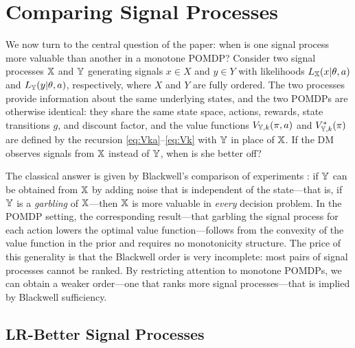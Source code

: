 \section{Comparing Signal Processes}\label{sec:comparison}

We now turn to the central question of the paper: when is one signal
process more valuable than another in a monotone POMDP? Consider two
signal processes ${\mathbb{X}}$ and ${\mathbb{Y}}$ generating signals $x \in X$ and
$y \in Y$ with likelihoods $L_{\mathbb{X}}(x|\theta,a)$ and $L_{\mathbb{Y}}(y|\theta,a)$,
respectively, where $X$ and $Y$ are fully ordered. The two processes
provide information about the same underlying states, and the two
POMDPs are otherwise identical: they share the same state space,
actions, rewards, state transitions $g$, and discount factor, and the
value functions $V_{{\mathbb{Y}},k}(\pi,a)$ and $V_{{\mathbb{Y}},k}^*(\pi)$ are defined
by the recursion \eqref{eq:Vka}--\eqref{eq:Vk} with ${\mathbb{Y}}$ in place of
${\mathbb{X}}$. If the DM observes signals from ${\mathbb{X}}$ instead of ${\mathbb{Y}}$, when is
she better off?

The classical answer is given by Blackwell's comparison of experiments
\citep{blackwell1951comparison}: if ${\mathbb{Y}}$ can be obtained from ${\mathbb{X}}$ by
adding noise that is independent of the state---that is, if ${\mathbb{Y}}$ is a
\emph{garbling} of ${\mathbb{X}}$---then ${\mathbb{X}}$ is more valuable in \emph{every}
decision problem. In the POMDP setting, the corresponding result---that
garbling the signal process for each action lowers the optimal value
function---follows from the convexity of the value function in the
prior \citep{smallwood1973optimal} and requires no monotonicity
structure. The price of this generality is that the Blackwell order is
very incomplete: most pairs of signal processes cannot be ranked. By
restricting attention to monotone POMDPs, we can obtain a weaker
order---one that ranks more signal processes---that is implied by
Blackwell sufficiency.

\subsection{LR-Better Signal Processes}\label{sec:lr-better}

